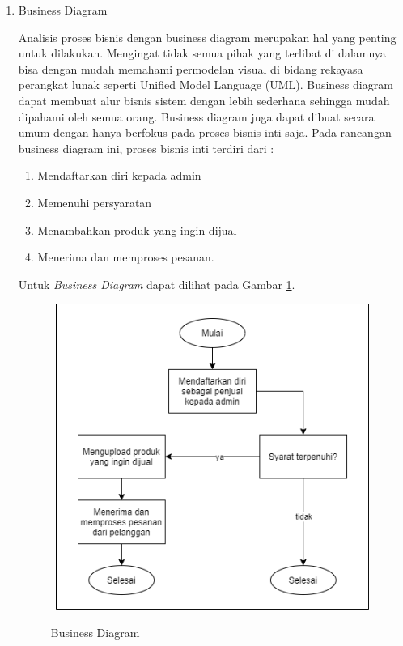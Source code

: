\begin{enumerate}
	\item Business Diagram
		\par Analisis proses bisnis dengan business diagram merupakan hal yang penting untuk dilakukan. Mengingat tidak semua pihak yang terlibat di dalamnya bisa
		dengan mudah memahami permodelan visual di bidang rekayasa perangkat lunak seperti Unified Model Language (UML). Business diagram dapat membuat alur
		bisnis sistem dengan lebih sederhana sehingga mudah dipahami oleh semua orang. Business diagram juga dapat dibuat secara umum dengan hanya berfokus pada proses bisnis inti saja. Pada rancangan business diagram ini, proses bisnis inti terdiri dari :

		\begin{enumerate}
			\item Mendaftarkan diri kepada admin
			\item Memenuhi persyaratan
			\item Menambahkan produk yang ingin dijual
			\item Menerima dan memproses pesanan.
		\end{enumerate}

		Untuk \textit{Business Diagram} dapat dilihat pada Gambar \ref{bisnis_diagram}.

		\begin{figure}[H]
		\centering
		{\includegraphics [width = 14cm, height= 10cm]{gambar/bisnis_diagram}}
		\caption{Business Diagram}
		\label{bisnis_diagram}
		\end{figure}


\end{enumerate}
